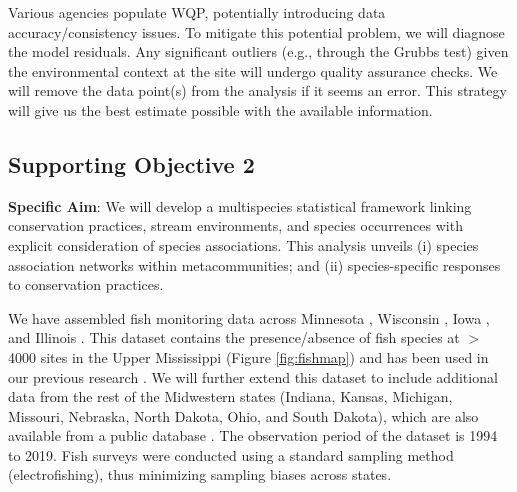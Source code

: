 \documentclass[12pt, class=article, crop=false]{standalone}
\begin{document}
Various agencies populate WQP, potentially introducing data accuracy/consistency issues.
To mitigate this potential problem, we will diagnose the model residuals.
Any significant outliers (e.g., through the Grubbs test) given the environmental context at the site will undergo quality assurance checks.
We will remove the data point(s) from the analysis if it seems an error.
This strategy will give us the best estimate possible with the available information.


\subsection{Supporting Objective 2}

\textbf{Specific Aim}: We will develop a multispecies statistical framework linking conservation practices, stream environments, and species occurrences with explicit consideration of species associations.
This analysis unveils (i) species association networks within metacommunities; and (ii) species-specific responses to conservation practices. 

We have assembled fish monitoring data across Minnesota \citep{minnesota_pollution_control_agency_development_2014}, Wisconsin \citep{wisconsin_department_of_natural_resources_guidelines_2018}, Iowa \citep{iowa_department_of_natural_resources_biological_2004}, and Illinois \citep{illinois_environmental_protection_agency_illinois_2014}.
This dataset contains the presence/absence of fish species at $>$ 4000 sites in the Upper Mississippi (Figure \ref{fig:fishmap}) and has been used in our previous research \citep{kim_metapopulation-level_2022, terui_emergent_2021}.
We will further extend this dataset to include additional data from the rest of the Midwestern states (Indiana, Kansas, Michigan, Missouri, Nebraska, North Dakota, Ohio, and South Dakota), which are also available from a public database \citep{hao_presence_2022}.
The observation period of the dataset is 1994 to 2019.
Fish surveys were conducted using a standard sampling method (electrofishing), thus minimizing sampling biases across states.
\end{document}
